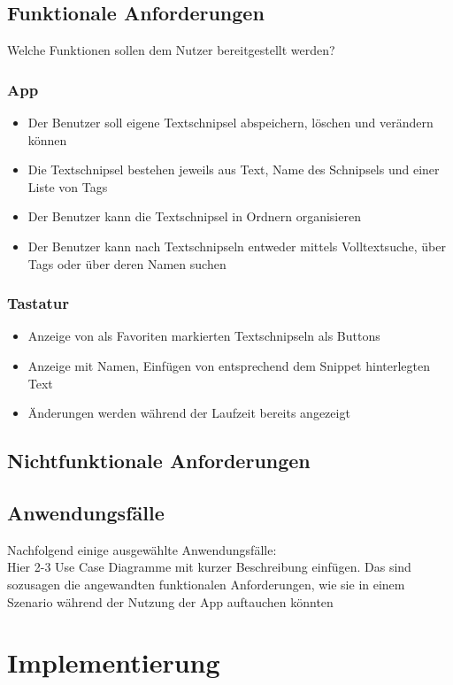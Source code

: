 \documentclass[11pt]{article}
\begin{document}
	\subsection{Funktionale Anforderungen}
	Welche Funktionen sollen dem Nutzer bereitgestellt werden?
	\subsubsection{App}
	\begin{itemize}
		\item Der Benutzer soll eigene Textschnipsel abspeichern, löschen und verändern können
		\item Die Textschnipsel bestehen jeweils aus Text, Name des Schnipsels und einer Liste von Tags
		\item Der Benutzer kann die Textschnipsel in Ordnern organisieren
		\item Der Benutzer kann nach Textschnipseln entweder mittels Volltextsuche, über Tags oder über deren Namen suchen
	\end{itemize}
	
	\subsubsection{Tastatur}
	\begin{itemize}
		\item Anzeige von als Favoriten markierten Textschnipseln als Buttons
		\item Anzeige mit Namen, Einfügen von entsprechend dem Snippet hinterlegten Text
		\item Änderungen werden während der Laufzeit bereits angezeigt
	\end{itemize}
	
	\subsection{Nichtfunktionale Anforderungen}
	\subsection{Anwendungsfälle}
	Nachfolgend einige ausgewählte Anwendungsfälle: \\
	Hier 2-3 Use Case Diagramme mit kurzer Beschreibung einfügen. Das sind sozusagen die angewandten funktionalen Anforderungen, wie sie in einem Szenario während der Nutzung der App auftauchen könnten
	
	
	\section{Implementierung}
\end{document}
